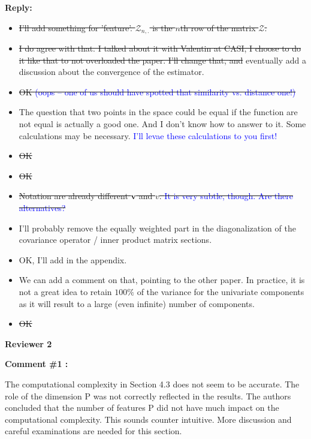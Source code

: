 \documentclass[11pt]{article}
\begin{document}
\medskip

\normalfont

\textbf{Reply:}

\begin{itemize}
  \item \sout{I'll add something for 'feature'. $\mathcal{Z}_{n,.}$ is the $n$th row of the matrix $\mathcal{Z}$.}
  \item \sout{I do agree with that. I talked about it with Valentin at CASI, I choose to do it like that to not overloaded the paper. I'll change that, and} eventually add a discussion about the convergence of the estimator.
  \item \sout{OK \textcolor{blue}{(oops – one of us should have spotted that similarity vs. distance one!)}}
  \item The question that two points in the space could be equal if the function are not equal is actually a good one. And I don't know how to answer to it. Some calculations may be necessary. \textcolor{blue}{I’ll levae these calculations to you first!}
  \item \sout{OK}
  \item \sout{OK}
  \item \sout{Notation are already different $\boldsymbol{v}$ and $v$. \textcolor{blue}{It is very subtle, though. Are there alternatives?}}
  \item I'll probably remove the equally weighted part in the diagonalization of the covariance operator / inner product matrix sections.
  \item OK, I'll add in the appendix.
  \item We can add a comment on that, pointing to the other paper. In practice, it is not a great idea to retain $100\%$ of the variance for the univariate components as it will result to a large (even infinite) number of components. 
  \item \sout{OK}  
\end{itemize}

\vspace*{1cm}


{\large \textbf{Reviewer 2} }


\bigskip

\itshape


\textbf{Comment \#1 :}

The computational complexity in Section 4.3 does not seem to be accurate. The role of the dimension P was not correctly reflected in the results. The authors concluded that the number of features P did not have much impact on the computational complexity. This sounds counter intuitive. More discussion and careful examinations are needed for this section.
\end{document}
